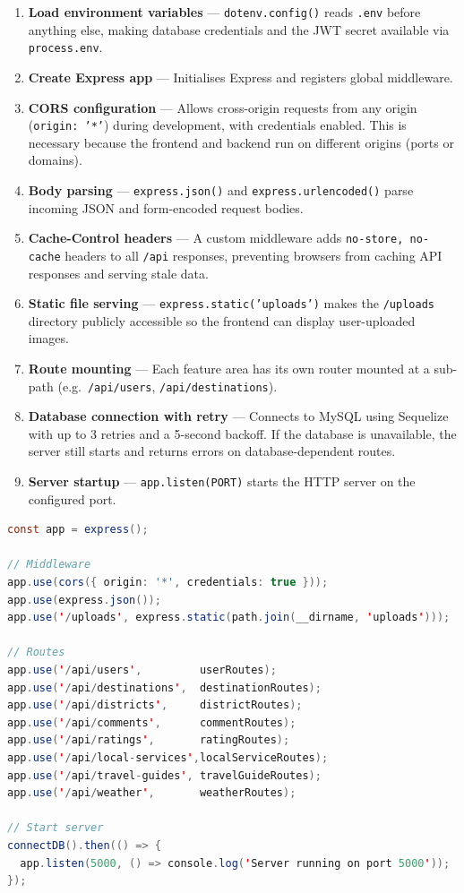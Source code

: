 \documentclass[12pt,a4paper]{report}
\begin{document}
\begin{enumerate}[leftmargin=2em]
  \item \textbf{Load environment variables} — \texttt{dotenv.config()} reads \texttt{.env} before anything else, making database credentials and the JWT secret available via \texttt{process.env}.
  \item \textbf{Create Express app} — Initialises Express and registers global middleware.
  \item \textbf{CORS configuration} — Allows cross-origin requests from any origin (\texttt{origin: '*'}) during development, with credentials enabled. This is necessary because the frontend and backend run on different origins (ports or domains).
  \item \textbf{Body parsing} — \texttt{express.json()} and \texttt{express.urlencoded()} parse incoming JSON and form-encoded request bodies.
  \item \textbf{Cache-Control headers} — A custom middleware adds \texttt{no-store, no-cache} headers to all \texttt{/api} responses, preventing browsers from caching API responses and serving stale data.
  \item \textbf{Static file serving} — \texttt{express.static('uploads')} makes the \texttt{/uploads} directory publicly accessible so the frontend can display user-uploaded images.
  \item \textbf{Route mounting} — Each feature area has its own router mounted at a sub-path (e.g.\ \texttt{/api/users}, \texttt{/api/destinations}).
  \item \textbf{Database connection with retry} — Connects to MySQL using Sequelize with up to 3 retries and a 5-second backoff. If the database is unavailable, the server still starts and returns errors on database-dependent routes.
  \item \textbf{Server startup} — \texttt{app.listen(PORT)} starts the HTTP server on the configured port.
\end{enumerate}

\begin{lstlisting}[language=Java, caption={server.js -- Startup sequence (simplified)}]
const app = express();

// Middleware
app.use(cors({ origin: '*', credentials: true }));
app.use(express.json());
app.use('/uploads', express.static(path.join(__dirname, 'uploads')));

// Routes
app.use('/api/users',         userRoutes);
app.use('/api/destinations',  destinationRoutes);
app.use('/api/districts',     districtRoutes);
app.use('/api/comments',      commentRoutes);
app.use('/api/ratings',       ratingRoutes);
app.use('/api/local-services',localServiceRoutes);
app.use('/api/travel-guides', travelGuideRoutes);
app.use('/api/weather',       weatherRoutes);

// Start server
connectDB().then(() => {
  app.listen(5000, () => console.log('Server running on port 5000'));
});
\end{lstlisting}
\end{document}
